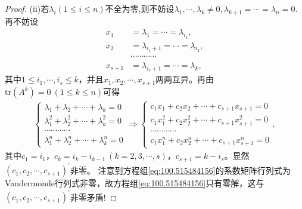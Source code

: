 \documentclass[../../main.tex]{subfiles}%
\begin{document}
\begin{proof}
(ii)若$\lambda_i(1\leqslant  i\leqslant  n)$不全为零,则不妨设$\lambda_1,\cdots,\lambda_k\ne 0,\lambda_{k+1}=\cdots=\lambda_n=0$.再不妨设
\begin{align*}
x_1&=\lambda _1=\cdots =\lambda _{i_1},\\
x_2&=\lambda _{i_1+1}=\cdots =\lambda _{i_2},\\
&\cdots \cdots \cdots \cdots \\
x_{s + 1}&=\lambda _{i_s+1}=\cdots =\lambda _k,
\end{align*}
其中$1\leqslant  i_1,\cdots,i_s\leqslant  k$，并且$x_1,x_2,\cdots,x_{s + 1}$两两互异。再由$\mathrm{tr}(A^k)=0\ (1\leqslant  k\leqslant  n)$可得
\begin{align}
\begin{cases}
\lambda _1+\lambda _2+\cdots +\lambda _k=0\\
\lambda _{1}^{2}+\lambda _{2}^{2}+\cdots +\lambda _{k}^{2}=0\\
\cdots \cdots \cdots \cdots\\
\lambda _{1}^{n}+\lambda _{2}^{n}+\cdots +\lambda _{k}^{n}=0
\end{cases}\Longrightarrow 
\begin{cases}
c_1x_1+c_2x_2+\cdots +c_{s + 1}x_{s + 1}=0\\
c_1x_{1}^{2}+c_2x_{2}^{2}+\cdots +c_{s + 1}x_{s + 1}^{2}=0\\
\cdots \cdots \cdots \cdots\\
c_1x_{1}^{n}+c_2x_{2}^{n}+\cdots +c_{s + 1}x_{s + 1}^{n}=0
\end{cases}, \label{eq:100.515484156}
\end{align}
其中$c_1 = i_1$，$c_k = i_k - i_{k - 1}\ (k = 2,3,\cdots,s)$，$c_{s + 1} = k - i_s$。显然$(c_1,c_2,\cdots,c_{s + 1})^\prime$非零。
注意到方程组\eqref{eq:100.515484156}的系数矩阵行列式为Vandermonde行列式非零，故方程组\eqref{eq:100.515484156}只有零解，这与$(c_1,c_2,\cdots,c_{s + 1})^\prime$非零矛盾! \end{proof}
\end{document}
